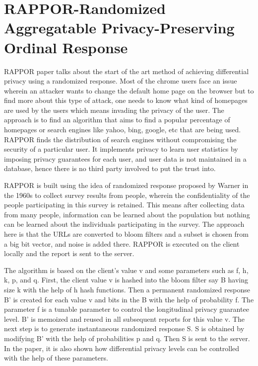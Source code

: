 \section{RAPPOR-Randomized Aggregatable Privacy-Preserving Ordinal Response}
\label{sec:rwRappor}
RAPPOR paper \cite{5} talks about the start of the art method of achieving differential privacy using a randomized response. Most of the chrome users face an issue wherein an attacker wants to change the default home page on the browser but to find more about this type of attack, one needs to know what kind of homepages are used by the users which means invading the privacy of the user. The approach is to find an algorithm that aims to find a popular percentage of homepages or search engines like yahoo, bing, google, etc that are being used. RAPPOR finds the distribution of search engines without compromising the security of a particular user. It implements privacy to learn user statistics by imposing privacy guarantees for each user, and user data is not maintained in a database, hence there is no third party involved to put the trust into.

RAPPOR is built using the idea of randomized response \cite{14} proposed by Warner in the 1960s to collect survey results from people, wherein the confidentiality of the people participating in this survey is retained. This means after collecting data from many people, information can be learned about the population but nothing can be learned about the individuals participating in the survey. The approach here is that the URLs are converted to bloom filters and a subset is chosen from a big bit vector, and noise is added there. RAPPOR is executed on the client locally and the report is sent to the server. 


The algorithm is based on the client's value v and some parameters such as f, h, k, p, and q. First, the client value v is hashed into the bloom filter say B having size k with the help of h hash functions. Then a permanent randomized response B' is created for each value v and bits in the B with the help of probability f. The parameter f is a tunable parameter to control the longitudinal privacy guarantee level. B' is memoized and reused in all subsequent reports for this value v. The next step is to generate instantaneous randomized response S. S is obtained by modifying B' with the help of probabilities p and q. Then S is sent to the server. In the paper, it is also shown how differential privacy levels can be controlled with the help of these parameters.


